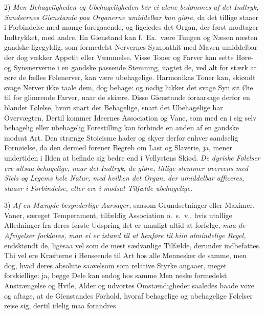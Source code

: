 \documentclass[12pt,a4paper]{article}
\newcommand{\opage}[1]{\marginnote{\footnotesize\textit{[#1]}}}
\begin{document}
2) \emph{Men Behageligheden og Ubehageligheden bør ei alene bedømmes af det Indtryk,
Sandsernes Gienstande paa Organerne umiddelbar kan giøre,} da det tillige staaer i
Forbindelse med mange foregaaende, og ligeledes det Organ, der først modtager Indtrykket,
med andre. En Gienstand kan f.~Ex.\ være Tungen og Næsen næsten gandske ligegyldig, som
formedelst Nervernes Sympathit med Maven umiddelbar der dog vækker Appetit eller Væmmelse.
Visse Toner og Farver kan sette Høre- og Synsnerverne i en gandske passende Stemning,
uagtet de, ved alt for stærk at røre de fælles Følenerver, kan være ubehagelige. Harmonikas
Toner kan, skiøndt svage Nerver ikke taale dem, dog behage: og nødig lukker det svage Syn
sit Øie til for glimrende Farver, naar de skiære. Disse Gienstande foraarsage
\opage{234} derfor en blandet Følelse, hvori snart det Behagelige, snart det Ubehagelige har
Overvægten. Dertil kommer Ideernes Association og Vane, som med en i sig selv behagelig
eller ubehagelig Forestilling kan forbinde en anden af en gandske modsat Art. Den strænge
Stoicisme hader og skyer derfor enhver sandselig Fornøielse, da den dermed forener Begreb
om Last og Slaverie, ja, mener undertiden i Ilden at befinde sig bedre end i Vellystens
Skiød. \emph{De dyriske Følelser ere altsaa behagelige, naar det Indtryk, de giøre, tillige
stemmer overeens med Siels og Legems hele Natur, med hvilken det Organ, der umiddelbar
afficeres, staaer i Forbindelse, eller ere i modsat Tilfælde ubehagelige.}

3) \emph{Af en Mængde besynderlige Aarsager,} saasom Grundsetninger eller Maximer, Vaner,
særeget Temperament, tilfældig Association o.~s.~v., hvis utallige Afledninger fra deres
første Udspring det er umuligt altid at forfølge, \emph{maa de Afvigelser forklares, man ei
er istand til at henføre til hiin almindelige Regel,} endskiøndt de, ligesaa vel som de
mest sædvanlige Tilfælde, derunder indbefattes. Thi vel ere Kræfterne i Henseende til Art
hos alle Mennesker de samme, men dog, hvad deres absolute saavelsom som relative Styrke
angaaer, meget forskiellige: ja, begge Dele kan endog hos samme Men%
\opage{235}neske formedelst Anstrængelse og Hvile, Alder og udvortes Omstændigheder saaledes baade
voxe og aftage, at de Gienstandes Forhold, hvoraf behagelige og ubehagelige Følelser reise
sig, dertil idelig maa forandres.
\end{document}
